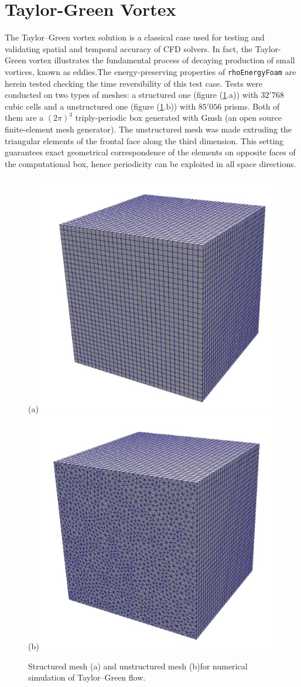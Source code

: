 \documentclass[a5paper]{sapthesis}
\begin{document}
	\section{Taylor-Green Vortex}
	The Taylor–Green vortex solution is a classical case used for testing and validating spatial and temporal accuracy of CFD solvers. In fact, the Taylor-Green vortex illustrates the fundamental process of decaying production of small vortices, known as eddies.The energy-preserving properties of \texttt{rhoEnergyFoam} are herein tested checking the time reversibility of this test case. Tests were conducted on two types of meshes: a structured one (figure (\ref{TGV_mesh}.a)) with $32'768$ cubic cells and a unstructured one (figure (\ref{TGV_mesh}.b)) with $85'056$ prisms. Both of them are a $(2\pi)^3$ triply-periodic box generated with Gmsh (an open source finite-element mesh generator). The unstructured mesh was made extruding the triangular elements of the frontal face along the third dimension. This setting guarantees exact geometrical correspondence of the elements on opposite faces of the computational box, hence periodicity can be exploited in all space directions.
	
	\begin{figure}[h]
		\centering
		(a)\includegraphics[width=0.4\linewidth]{Figures/TGV_mesh_structured}
		(b)\includegraphics[width=0.4\linewidth]{Figures/TGV_mesh_unstructured}\\
		\caption{Structured mesh (a) and unstructured mesh (b)for numerical simulation of Taylor–Green ﬂow.}
		\label{TGV_mesh}
	\end{figure} 
	
\end{document}
